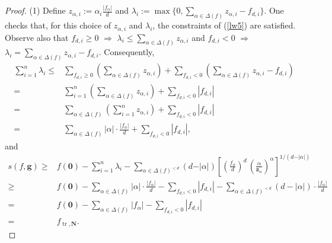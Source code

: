 \documentclass{amsart}
\theoremstyle{definition}
\begin{document}
\begin{proof}
(1) Define $z_{\alpha,i}:= \alpha_i\frac{|f_{\alpha}|}{d}$ and
$\lambda_i := \max\{ 0, \sum_{\alpha\in \Delta(f)} z_{\alpha,i} - f_{d,i}\}$. One checks that, for this choice of
$z_{\alpha,i}$ and $\lambda_i$, the constraints of (\ref{lw5}) are satisfied. Observe also that $f_{d,i}\ge 0$ $\Rightarrow$
$\lambda_i \le \sum_{\alpha\in \Delta(f)} z_{\alpha,i}$ and $f_{d,i}<0$ $\Rightarrow$
$\lambda_i = \sum_{\alpha\in \Delta(f)}z_{\alpha,i}-f_{d,i}$. Consequently,
%
\begin{align*}
\sum_{i=1}^n \lambda_i \le& \sum_{f_{d,i}\ge 0} (\sum_{\alpha\in \Delta(f)} z_{\alpha,i})+ \sum_{f_{d,i}<0}(\sum_{\alpha\in\Delta(f)}z_{\alpha,i}-f_{d,i})\\
=& \sum_{i=1}^n (\sum_{\alpha\in \Delta(f)} z_{\alpha,i})+\sum_{f_{d,i}<0} |f_{d,i}|\\
=& \sum_{\alpha\in \Delta(f)}(\sum_{i=1}^n z_{\alpha,i})+\sum_{f_{d,i}<0} |f_{d,i}| \\
=& \sum_{\alpha\in \Delta(f)}|\alpha|\cdot \frac{|f_{\alpha}|}{d} +\sum_{f_{d,i}<0} |f_{d,i}|,
\end{align*}
%
and
%
\begin{align*}
s(f,\mathbf{g}) \ge& f(\mathbf{0})-\sum_{i=1}^n \lambda_i- \sum_{\alpha\in\Delta(f)^{<d}} (d-\vert\alpha\vert)\left[
\left(\frac{f_\alpha}{d}\right)^{d}\,\left(\frac{\alpha}{\mathbf{z}_\alpha}\right)^\alpha
\right]^{1/(d-\vert\alpha\vert)}\\
\ge& f(\mathbf{0})- \sum_{\alpha\in \Delta(f)}|\alpha|\cdot \frac{|f_{\alpha}|}{d} -\sum_{f_{d,i}<0} |f_{d,i}|-
\sum_{\alpha\in \Delta(f)^{<d}}(d-|\alpha|)\cdot\frac{|f_{\alpha}|}{d}\\
=&f(\mathbf{0})-\sum_{\alpha\in \Delta(f)} |f_{\alpha}|  -\sum_{f_{d,i}<0} |f_{d,i}|\\
=& f_{\operatorname{tr},\mathbf{N}}.
\end{align*}
%


\end{proof}
\end{document}
